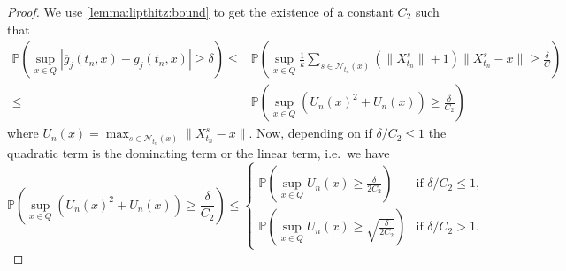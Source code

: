\documentclass[11pt,reqno,a4paper]{amsart}
\theoremstyle{definition}
\numberwithin{equation}{section}
\newcommand{\widebar}[1]{\overline{#1}}
\renewcommand{\P}{\mathbb{P}}
\DeclareMathOperator{\1}{\mathbbm{1}}
\begin{document}
\begin{proof}
  We use \cref{lemma:lipthitz:bound} to get the existence of a constant $C_2$ such that
  \begin{align*}
    \P(\sup_{x \in Q} |\widebar{g}_j(t_n,x) - g_j(t_n,x)| \geq \delta)
    \leq &
    \P\left (\sup_{x \in Q} \frac{1}{k} \sum_{s \in \mathcal{N}_{t_n}(x)} \left (\|X_{t_n}^{s}\| + 1 \right ) \|X_{t_n}^{s} - x\| \geq \frac{\delta}{C}\right )
    \\
    \leq &
    \P\left (\sup_{x \in Q} (U_n(x)^2+U_n(x)) \geq \frac{\delta}{C_2}\right )
  \end{align*}
  where $U_n(x) = \max_{s \in \mathcal{N}_{t_n}(x)} \|X_{t_n}^{s} - x\|$.
  Now, depending on if $\delta/C_2 \leq 1$ the quadratic term is the dominating term or the linear term, i.e.~we have
  \begin{equation} \label{eq:Un:bound}
    \P\left (\sup_{x \in Q} (U_n(x)^2+U_n(x)) \geq \frac{\delta}{C_2}\right )
    \leq
    \begin{cases}
      \P\left (\sup_{x \in Q} U_n(x) \geq \frac{\delta}{2 C_2}\right )        & \text{if } \delta/C_2 \leq 1,
      \\
      \P\left (\sup_{x \in Q} U_n(x) \geq \sqrt{\frac{\delta}{2 C_2}}\right ) & \text{if } \delta/C_2 > 1.
    \end{cases}
  \end{equation}


\end{proof}
\end{document}
